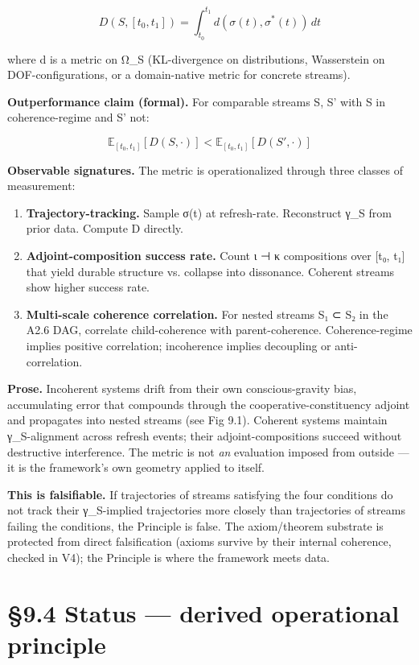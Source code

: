 \documentclass[11pt, openany]{book}
\newcommand{\sectionbreak}{\clearpage}
\begin{document}
$$D(S, [t_0, t_1]) = \int_{t_0}^{t_1} d(\sigma(t), \sigma^*(t)) \, dt$$

where d is a metric on Ω\_\allowbreak{}S (KL-divergence on distributions, Wasserstein on DOF-configurations, or a domain-native metric for concrete streams).

\textbf{Outperformance claim (formal).} For comparable streams S, S' with S in coherence-regime and S' not:

$$\mathbb{E}_{[t_0, t_1]}[D(S, \cdot)] < \mathbb{E}_{[t_0, t_1]}[D(S', \cdot)]$$

\textbf{Observable signatures.} The metric is operationalized through three classes of measurement:

\begin{enumerate}
\item \textbf{Trajectory-tracking.} Sample σ(t) at refresh-rate. Reconstruct γ\_\allowbreak{}S from prior data. Compute D directly.
\item \textbf{Adjoint-composition success rate.} Count ι ⊣ κ compositions over [t₀, t₁] that yield durable structure vs. collapse into dissonance. Coherent streams show higher success rate.
\item \textbf{Multi-scale coherence correlation.} For nested streams S₁ ⊂ S₂ in the A2.6 DAG, correlate child-coherence with parent-coherence. Coherence-regime implies positive correlation; incoherence implies decoupling or anti-correlation.
\end{enumerate}

\textbf{Prose.} Incoherent systems drift from their own conscious-gravity bias, accumulating error that compounds through the cooperative-constituency adjoint and propagates into nested streams (see Fig 9.1). Coherent systems maintain γ\_\allowbreak{}S-alignment across refresh events; their adjoint-compositions succeed without destructive interference. The metric is not \textit{an} evaluation imposed from outside --- it is the framework's own geometry applied to itself.

\textbf{This is falsifiable.} If trajectories of streams satisfying the four conditions do not track their γ\_\allowbreak{}S-implied trajectories more closely than trajectories of streams failing the conditions, the Principle is false. The axiom/theorem substrate is protected from direct falsification (axioms survive by their internal coherence, checked in V4); the Principle is where the framework meets data.

\sectionbreak

\section{§9.4 Status --- derived operational principle}
\end{document}
